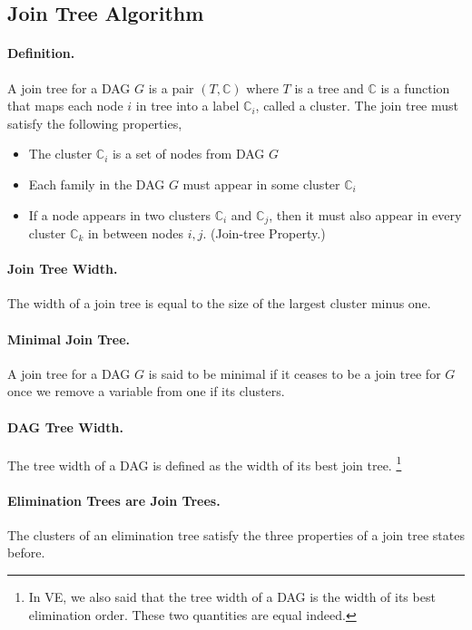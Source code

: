 \documentclass[11pt]{article}
\begin{document}
\subsection{Join Tree Algorithm}
\paragraph{Definition.} A join tree for a DAG $G$ is a pair $(T, \mathbb C)$ where $T$ is a tree and $\mathbb C$ is a function that maps each node $i$ in tree into a label $\mathbb C_i$, called a cluster. The join tree must satisfy the following properties, 
\begin{itemize}
	\item The cluster $\mathbb C_i$ is a set of nodes from DAG $G$
	\item Each family in the DAG $G$ must appear in some cluster $\mathbb C_i$ 
	\item If a node appears in two clusters $\mathbb C_i$ and $\mathbb C_j$, then it must also appear in every cluster $\mathbb C_k$ in between nodes $i, j$. (Join-tree Property.)
\end{itemize}

\paragraph{Join Tree Width.} The width of a join tree is equal to the size of the largest cluster minus one. 

\paragraph{Minimal Join Tree.} A join tree for a DAG $G$ is said to be minimal if it ceases to be a join tree for $G$ once we remove a variable from one if its clusters. 

\paragraph{DAG Tree Width.} The tree width of a DAG is defined as the width of its best join tree. \footnote{In VE, we also said that the tree width of a DAG is the width of its best elimination order. These two quantities are equal indeed.} 

\paragraph{Elimination Trees are Join Trees.} The clusters of an elimination tree satisfy the three properties of a join tree states before. 
\end{document}
